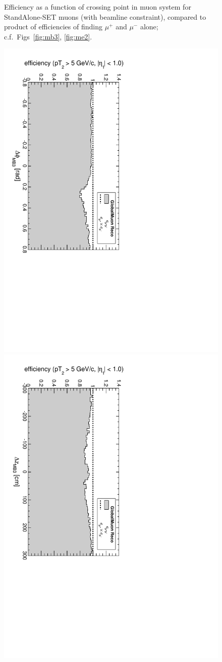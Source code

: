 \documentclass[12pt]{article}
\begin{document}
\begin{figure}[p]
\caption{Efficiency as a function of crossing point in muon system for
  StandAlone-SET muons (with beamline constraint), compared to product of
  efficiencies of finding $\mu^+$ and $\mu^-$ alone;
  c.f.\ Figs~\ref{fig:mb3}, \ref{fig:me2}.}
\end{figure}

\begin{figure}[p]
\includegraphics[height=0.5\linewidth, angle=90]{fig/acceptance7_plot/vsmb3dphi_GlobalMuons.pdf}
\includegraphics[height=0.5\linewidth, angle=90]{fig/acceptance7_plot/vsmb3dz_GlobalMuons.pdf}


\end{figure}
\end{document}
